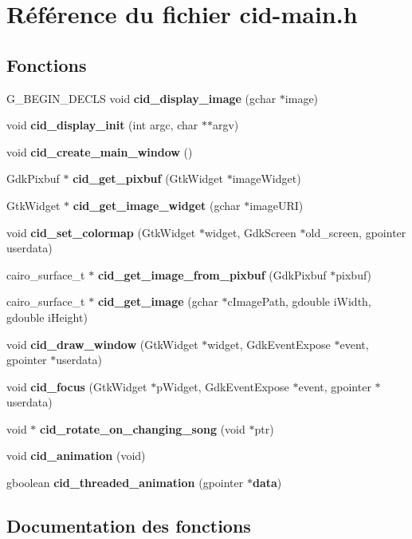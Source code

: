 \section{Référence du fichier cid-main.h}
\label{cid-main_8h}
\subsection*{Fonctions}
\begin{CompactItemize}
\item 
G\_\-BEGIN\_\-DECLS void {\bf cid\_\-display\_\-image} (gchar $\ast$image)
\item 
void {\bf cid\_\-display\_\-init} (int argc, char $\ast$$\ast$argv)
\item 
void {\bf cid\_\-create\_\-main\_\-window} ()
\item 
GdkPixbuf $\ast$ {\bf cid\_\-get\_\-pixbuf} (GtkWidget $\ast$imageWidget)
\item 
GtkWidget $\ast$ {\bf cid\_\-get\_\-image\_\-widget} (gchar $\ast$imageURI)
\item 
void {\bf cid\_\-set\_\-colormap} (GtkWidget $\ast$widget, GdkScreen $\ast$old\_\-screen, gpointer userdata)
\item 
cairo\_\-surface\_\-t $\ast$ {\bf cid\_\-get\_\-image\_\-from\_\-pixbuf} (GdkPixbuf $\ast$pixbuf)
\item 
cairo\_\-surface\_\-t $\ast$ {\bf cid\_\-get\_\-image} (gchar $\ast$cImagePath, gdouble iWidth, gdouble iHeight)
\item 
void {\bf cid\_\-draw\_\-window} (GtkWidget $\ast$widget, GdkEventExpose $\ast$event, gpointer $\ast$userdata)
\item 
void {\bf cid\_\-focus} (GtkWidget $\ast$pWidget, GdkEventExpose $\ast$event, gpointer $\ast$userdata)
\item 
void $\ast$ {\bf cid\_\-rotate\_\-on\_\-changing\_\-song} (void $\ast$ptr)
\item 
void {\bf cid\_\-animation} (void)
\item 
gboolean {\bf cid\_\-threaded\_\-animation} (gpointer $\ast${\bf data})
\end{CompactItemize}


\subsection{Documentation des fonctions}
